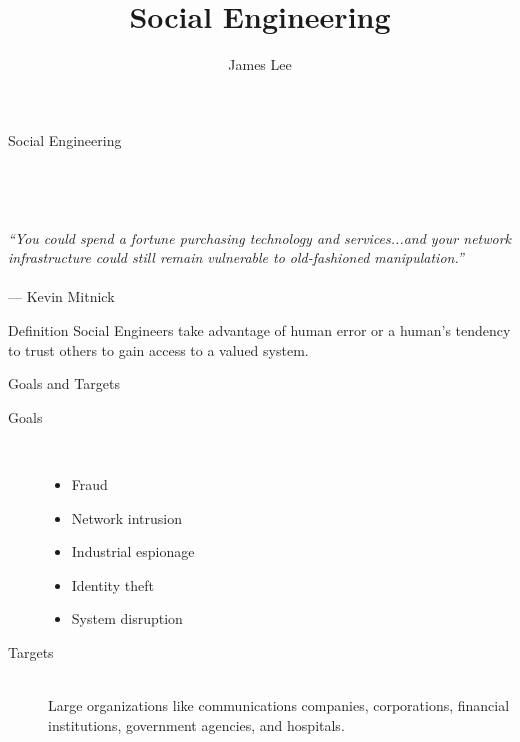 \documentclass[default,pdf,colorBG,slideColor]{prosper}
\title{Social Engineering}
\author{James Lee}
\begin{document}
\maketitle

\begin{slide}{Social Engineering}
\ \\
\ \\
\ \\
\ \\
\ \\
\center
\textit{``You could spend a fortune purchasing technology and services...and your network infrastructure could still remain vulnerable to old-fashioned manipulation.''}
\ \\
\ \\
\hspace{2in}--- Kevin Mitnick
\end{slide}

\begin{slide}{Definition}
Social Engineers take advantage of human error or a human's tendency to trust others to gain access to a valued system.
\end{slide}

\begin{slide}{Goals and Targets}
\begin{description}
\item[Goals]
\ \\
\begin{itemize}
\item Fraud
\item Network intrusion
\item Industrial espionage
\item Identity theft
\item System disruption
\end{itemize}

\item[Targets] 
\ \\
Large organizations like communications companies, corporations, financial institutions, government agencies, and hospitals.
\end{description}
\end{slide}

\end{document}
